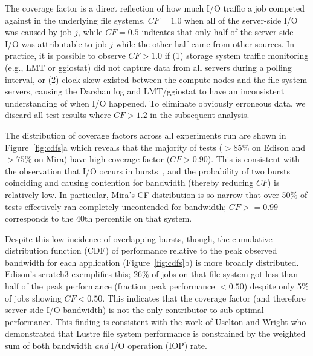 The coverage factor is a direct reflection of how much I/O traffic a job competed against in the underlying file systems.
$CF = 1.0$ when all of the server-side I/O was caused by job $j$, while $CF = 0.5$ indicates that only half of the server-side I/O was attributable to job $j$ while the other half came from other sources.
In practice, it is possible to observe $CF > 1.0$ if
(1) storage system traffic monitoring (e.g., LMT or ggiostat) did not capture data from all servers during a polling interval, or
(2) clock skew existed between the compute nodes and the file system servers, causing the Darshan log and LMT/ggiostat to have an inconsistent understanding of when I/O happened.
To eliminate obviously erroneous data, we discard all test results where $CF > 1.2$ in the subsequent analysis.

The distribution of coverage factors across all experiments run are shown in Figure~\ref{fig:cdfs}a which reveals that the majority of tests ($> 85\%$ on Edison and $> 75\%$ on Mira) have high coverage factor ($\mathit{CF} > 0.90$).
This is consistent with the observation that I/O occurs in bursts~\cite{Carns2011,Liu2016}, and the probability of two bursts coinciding and causing contention for bandwidth (thereby reducing $\mathit{CF}$) is relatively low.
In particular, Mira's CF distribution is so narrow that over 50\% of tests effectively ran completely uncontended for bandwidth; $\mathit{CF} >= 0.99$ corresponds to the 40th percentile on that system.

Despite this low incidence of overlapping bursts, though, the cumulative
distribution function (CDF) of performance relative to the peak observed
bandwidth for each application (Figure~\ref{fig:cdfs}b) is more broadly distributed.
Edison's scratch3 exemplifies this; 26\% of jobs on that file system got less than half of the peak performance (fraction peak performance $< 0.50$) despite only 5\% of jobs showing $\mathit{CF} < 0.50$.  This indicates that the coverage factor (and therefore server-side I/O bandwidth) is not the only contributor to sub-optimal performance.  
This finding is consistent with the work of Uselton and Wright\cite{Uselton2013} who demonstrated that Lustre file system performance is constrained by the weighted sum of both bandwidth \emph{and} I/O operation (IOP) rate.  

